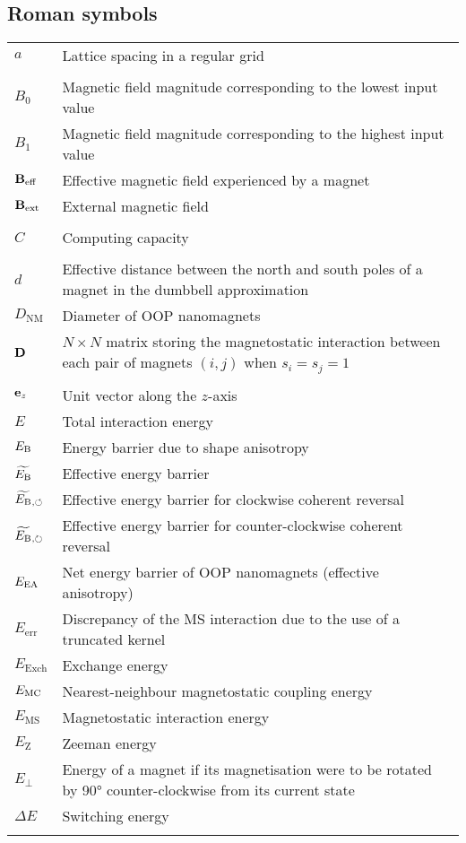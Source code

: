 \subsection*{Roman symbols}
\begin{longtable}[l]{p{60pt} p{350pt}}
	$a$ & Lattice spacing in a regular grid \\
	&\\

	$B_0$ & Magnetic field magnitude corresponding to the lowest input value \\
	$B_1$ & Magnetic field magnitude corresponding to the highest input value \\
	$\boldsymbol{\mathbf{B}}_\mathrm{eff}$ & Effective magnetic field experienced by a magnet \\
	$\boldsymbol{\mathbf{B}}_\mathrm{ext}$ & External magnetic field \\
	&\\
	
	$C$ & Computing capacity \\
	&\\

	$d$ & Effective distance between the north and south poles of a magnet in the dumbbell approximation \\
	$D_\mathrm{NM}$ & Diameter of OOP nanomagnets \\
	$\boldsymbol{\mathbf{D}}$ & $N \times N$ matrix storing the magnetostatic interaction between each pair of magnets $(i,j)$ when $s_i=s_j=1$ \\
	&\\

	$\boldsymbol{\mathbf{e}}_z$ & Unit vector along the $z$-axis \\
	$E$ & Total interaction energy \\
	$E_\mathrm{B}$ & Energy barrier due to shape anisotropy \\ %
	$\widetilde{E_\mathrm{B}}$ & Effective energy barrier \\
	$\widetilde{E_\mathrm{B}}{}_{,\circlearrowleft}$ & Effective energy barrier for clockwise coherent reversal \\
	$\widetilde{E_\mathrm{B}}{}_{,\circlearrowright}$ & Effective energy barrier for counter-clockwise coherent reversal \\
	$E_\mathrm{EA}$ & Net energy barrier of OOP nanomagnets (effective anisotropy) \\
	$E_\mathrm{err}$ & Discrepancy of the MS interaction due to the use of a truncated kernel \\
	$E_\mathrm{Exch}$ & Exchange energy\\
	$E_\mathrm{MC}$ & Nearest-neighbour magnetostatic coupling energy \\
	$E_\mathrm{MS}$ & Magnetostatic interaction energy \\
	$E_\mathrm{Z}$ & Zeeman energy\\
	$E_\perp$ & Energy of a magnet if its magnetisation were to be rotated by \ang{90} counter-clockwise from its current state \\
	$\Delta E$ & Switching energy \\
	&\\
	

\end{longtable}
